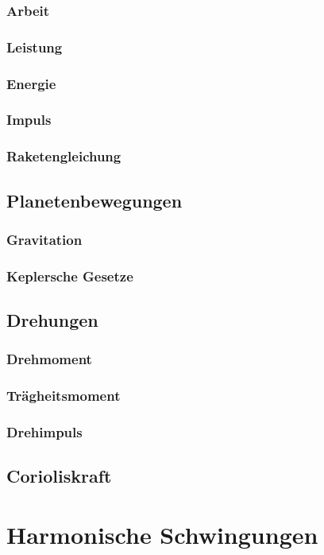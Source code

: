 \documentclass[german]{latex4ei/latex4ei_sheet}
\begin{document}
\subsubsection{Arbeit}
\subsubsection{Leistung}
\subsubsection{Energie}
\subsubsection{Impuls}
\subsubsection{Raketengleichung}
\subsection{Planetenbewegungen}
\subsubsection{Gravitation}
\subsubsection{Keplersche Gesetze}
\subsection{Drehungen}
\subsubsection{Drehmoment}
\subsubsection{Trägheitsmoment}
\subsubsection{Drehimpuls}
\subsection{Corioliskraft}

\section{Harmonische Schwingungen}
\end{document}
